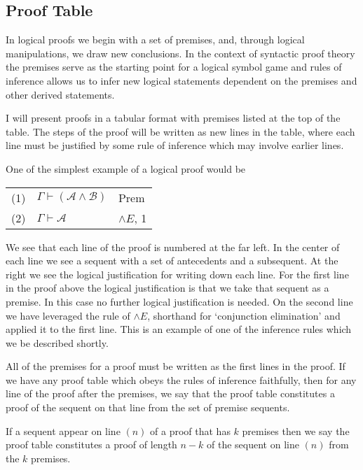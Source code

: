 \documentclass[12pt]{article}
\theoremstyle{break}
\theoremstyle{break}
\theoremstyle{break}
\theoremstyle{break}
\newcommand{\mc}[1]{\mathcal{#1}}
\begin{document}
\subsection{Proof Table}

In logical proofs we begin with a set of premises, and, through logical manipulations, we draw new conclusions.
In the context of syntactic proof theory the premises serve as the starting point for a logical symbol game and rules of inference allows us to infer new logical statements dependent on the premises and other derived statements.

I will present proofs in a tabular format with premises listed at the top of the table.
The steps of the proof will be written as new lines in the table, where each line must be justified by some rule of inference which may involve earlier lines. 

One of the simplest example of a logical proof would be

\begin{center}
\begin{tabular}{ p{1cm} p{6cm} p{2cm} }
(1) & $\Gamma \vdash (\mc{A} \land \mc{B})$ & Prem\\
(2) & $\Gamma \vdash \mc{A}$ & $\land E$, 1\\
\end{tabular}
\end{center}

We see that each line of the proof is numbered at the far left.
In the center of each line we see a sequent with a set of antecedents and a subsequent.
At the right we see the logical justification for writing down each line.
For the first line in the proof above the logical justification is that we take that sequent as a premise.
In this case no further logical justification is needed.
On the second line we have leveraged the rule of $\land E$, shorthand for `conjunction elimination' and applied it to the first line.
This is an example of one of the inference rules which we be described shortly.

All of the premises for a proof must be written as the first lines in the proof.
If we have any proof table which obeys the rules of inference faithfully, then for any line of the proof after the premises, we say that the proof table constitutes a proof of the sequent on that line from the set of premise sequents.

If a sequent appear on line $(n)$ of a proof that has $k$ premises then we say the proof table constitutes a proof of length $n-k$ of the sequent on line $(n)$ from the $k$ premises.
\end{document}
